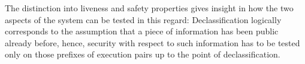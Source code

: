 \documentclass{llncs}
\begin{document}
The distinction into liveness and safety properties gives insight in how the two aspects of the system can be tested in this regard:
Declassification logically corresponds to the assumption that a piece of information has been public already before,
hence, security with respect to such information has to be tested only on those prefixes of execution pairs up to the point of declassification.

\cite{chudnov2014information}
\cite{chudnov2018assuming}



\end{document}
